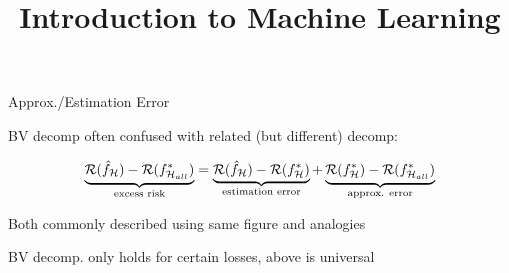 \documentclass[11pt,compress,t,notes=noshow, xcolor=table]{beamer}
\title{Introduction to Machine Learning}
\begin{document}


\begin{framei}[sep=M]{Approx./Estimation Error }

\item BV decomp often confused with related (but different) decomp: 

$$
\underbrace{\mathcal{R}(\hat f_{\mathcal{H}}) - \mathcal{R}(f^{\ast}_{\mathcal{H}_{all}})}_{\text{excess risk}} = \underbrace{\mathcal{R}(\hat f_{\mathcal{H}}) - \mathcal{R}(f^{\ast}_{\mathcal{H}})}_{\text{estimation error}} + \underbrace{\mathcal{R}(f^{\ast}_{\mathcal{H}}) -  \mathcal{R}(f^{\ast}_{\mathcal{H}_{all}})}_{\text{approx. error}} 
$$

\item Both commonly described using same figure and analogies


\vfill


\item BV decomp. only holds for certain losses, above is universal


\end{framei}
\end{document}
